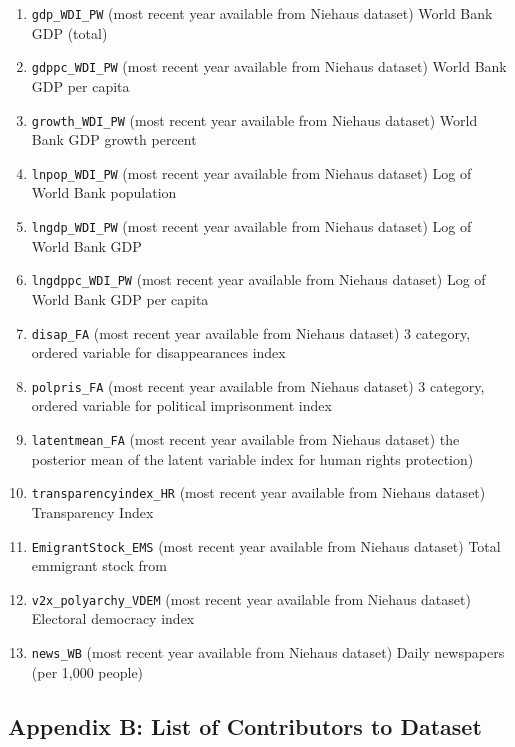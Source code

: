 \documentclass[]{article}
\begin{document}
\begin{enumerate}
\item
  \texttt{gdp\_WDI\_PW} (most recent year available from Niehaus dataset) World Bank GDP (total)
\item
  \texttt{gdppc\_WDI\_PW} (most recent year available from Niehaus dataset) World Bank GDP per capita
\item
  \texttt{growth\_WDI\_PW} (most recent year available from Niehaus dataset) World Bank GDP growth percent
\item
  \texttt{lnpop\_WDI\_PW} (most recent year available from Niehaus dataset) Log of World Bank population
\item
  \texttt{lngdp\_WDI\_PW} (most recent year available from Niehaus dataset) Log of World Bank GDP
\item
  \texttt{lngdppc\_WDI\_PW} (most recent year available from Niehaus dataset) Log of World Bank GDP per capita
\item
  \texttt{disap\_FA} (most recent year available from Niehaus dataset) 3 category, ordered variable for disappearances index
\item
  \texttt{polpris\_FA} (most recent year available from Niehaus dataset) 3 category, ordered variable for political imprisonment index
\item
  \texttt{latentmean\_FA} (most recent year available from Niehaus dataset) the posterior mean of the latent variable index for human rights protection)
\item
  \texttt{transparencyindex\_HR} (most recent year available from Niehaus dataset) Transparency Index
\item
  \texttt{EmigrantStock\_EMS} (most recent year available from Niehaus dataset) Total emmigrant stock from
\item
  \texttt{v2x\_polyarchy\_VDEM} (most recent year available from Niehaus dataset) Electoral democracy index
\item
  \texttt{news\_WB} (most recent year available from Niehaus dataset) Daily newspapers (per 1,000 people)
\end{enumerate}

\hypertarget{appendix-b-list-of-contributors-to-dataset}{%
\subsection*{Appendix B: List of Contributors to Dataset}\label{appendix-b-list-of-contributors-to-dataset}}
\end{document}
